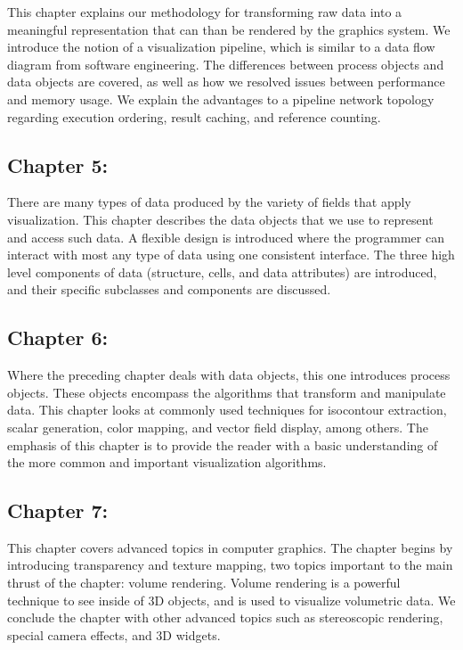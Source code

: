 This chapter explains our methodology for transforming raw data into a meaningful representation that can than be rendered by the graphics system. We introduce the notion of a visualization pipeline, which is similar to a data flow diagram from software engineering. The differences between process objects and data objects are covered, as well as how we resolved issues between performance and memory usage. We explain the advantages to a pipeline network topology regarding execution ordering, result caching, and reference counting.

\subsection*{Chapter 5: }

There are many types of data produced by the variety of fields that apply visualization. This chapter describes the data objects that we use to represent and access such data. A flexible design is introduced where the programmer can interact with most any type of data using one consistent interface. The three high level components of data (structure, cells, and data attributes) are introduced, and their specific subclasses and components are discussed.

\subsection*{Chapter 6: }

Where the preceding chapter deals with data objects, this one introduces process objects. These objects encompass the algorithms that transform and manipulate data. This chapter looks at commonly used techniques for isocontour extraction, scalar generation, color mapping, and vector field display, among others. The emphasis of this chapter is to provide the reader with a basic understanding of the more common and important visualization algorithms.

\subsection*{Chapter 7:  }

This chapter covers advanced topics in computer graphics. The chapter begins by introducing transparency and texture mapping, two topics important to the main thrust of the chapter: volume rendering. Volume rendering is a powerful technique to see inside of 3D objects, and is used to visualize volumetric data. We conclude the chapter with other advanced topics such as stereoscopic rendering, special camera effects, and 3D widgets.


